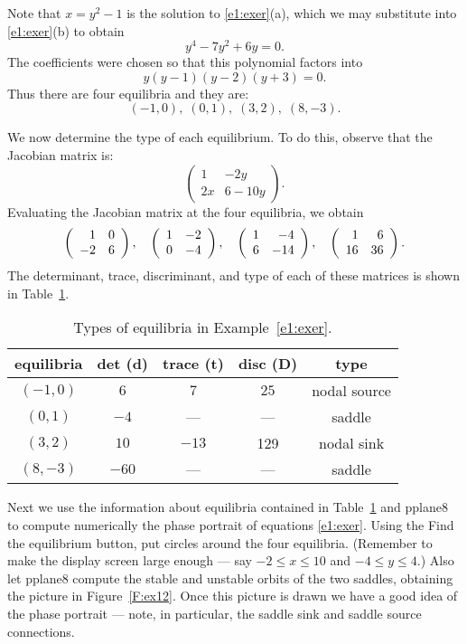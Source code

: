 \documentclass{ximera}
\begin{document}
Note that $x=y^2-1$ is the solution to \eqref{e1:exer}(a), which we
may substitute into \eqref{e1:exer}(b) to obtain
\[
y^4 - 7y^2 + 6y =0.
\]
The coefficients were chosen so that this polynomial factors
into 
\[
y(y-1)(y-2)(y+3) = 0.
\]
Thus there are four equilibria and they are:
\[
(-1,0),\; (0,1),\; (3,2),\; (8,-3).
\]

We now determine the type of each equilibrium.  To do this,
observe that the Jacobian matrix 
is:
\[
\left(\begin{array}{cc} 1 & -2y \\ 2x & 6-10y
\end{array}\right). 
\]
Evaluating the Jacobian matrix at the four equilibria, we obtain
\[
\left(\begin{array}{rr} 1 & 0\\ -2 &6\end{array}\right), \quad \left(\begin{array}{rr} 1 & -2\\ 0 &-4\end{array}\right), \quad
\left(\begin{array}{rr} 1 & -4\\ 6 &-14\end{array}\right), \quad \left(\begin{array}{rr} 1 & 6\\ 16 &36\end{array}\right).
\]
The determinant, trace, 
discriminant, and type of each of these
matrices is shown in Table~\ref{t:exertype}.
\begin{table}[htb]
\begin{center}
\begin{tabular}{|c|c|c|c|c|}
\hline
equilibria & det (d) & trace (t) & disc (D) & type \\
\hline
$(-1,0)$ & $6$ & $7$ & $25$ & nodal source \\
\hline
$(0,1)$ & $-4$ & --- & --- & saddle \\
\hline
$(3,2)$ & $10$ & $-13$ & 129 & nodal sink \\
\hline
$(8,-3)$ & $-60$ & --- & --- & saddle\\
\hline
\end{tabular}
\caption{Types of equilibria in Example~\protect\eqref{e1:exer}.}
\label{t:exertype}
\end{center}
\end{table}

Next we use the information about equilibria contained in 
Table~\ref{t:exertype} and {\sf pplane8}
 to compute numerically the 
phase portrait of equations \eqref{e1:exer}.  Using 
the {\sf Find the equilibrium} button, put circles around
the four equilibria.  (Remember to make the display screen large
enough --- say $-2\leq x \leq 10$ and $-4\leq y \leq 4$.) Also
let {\sf pplane8} compute the stable and unstable orbits of
the two saddles, obtaining the picture in Figure~\ref{F:ex12}.
Once this picture is drawn we have a good idea of the phase
portrait --- note, in particular, the saddle sink and saddle
source connections.
\end{document}
